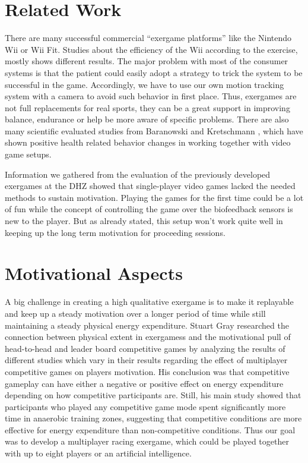 \begin{multicols}{2}
\section{Related Work}
There are many successful commercial “exergame platforms” like the Nintendo Wii or Wii Fit. Studies about the efficiency of the Wii according to the exercise, mostly shows different results. \cite{Baranowski2012} The major problem with most of the consumer systems is that the patient could easily adopt a strategy to trick the system to be successful in the game. Accordingly, we have to use our own motion tracking system with a camera to avoid such behavior in first place. Thus, exergames are not full replacements for real sports, they can be a great support in improving balance, endurance or help be more aware of specific problems. There are also many scientific evaluated studies from Baranowski \cite{Baranowski2008} and Kretschmann \cite{Kretschmann2010}, which have shown positive health related behavior changes in working together with video game setups.

Information we gathered from the evaluation of the previously developed exergames at the DHZ showed that single-player video games lacked the needed methods to sustain motivation. Playing the games for the first time could be a lot of fun while the concept of controlling the game over the biofeedback sensors is new to the player. But as already stated, this setup won't work quite well in keeping up the long term motivation for proceeding sessions.


\section{Motivational Aspects}

A big challenge in creating a high qualitative exergame is to make it replayable and keep up a steady motivation over a longer period of time while still maintaining a steady physical energy expenditure. 
Stuart Gray researched the connection between physical extent in exergamess and the motivational pull of head-to-head and leader board competitive games \cite{Gray2013} by analyzing the results of different studies which vary in their results regarding the effect of multiplayer competitive games on players motivation. His conclusion was that competitive gameplay can have either a negative or positive effect on energy expenditure depending on how competitive participants are. Still, his main study showed that participants who played any competitive game mode spent significantly more time in anaerobic training zones, suggesting that competitive conditions are more effective for energy expenditure than non-competitive conditions. Thus our goal was to develop a multiplayer racing exergame, which could be played together with up to eight players or an artificial intelligence.


\end{multicols}
